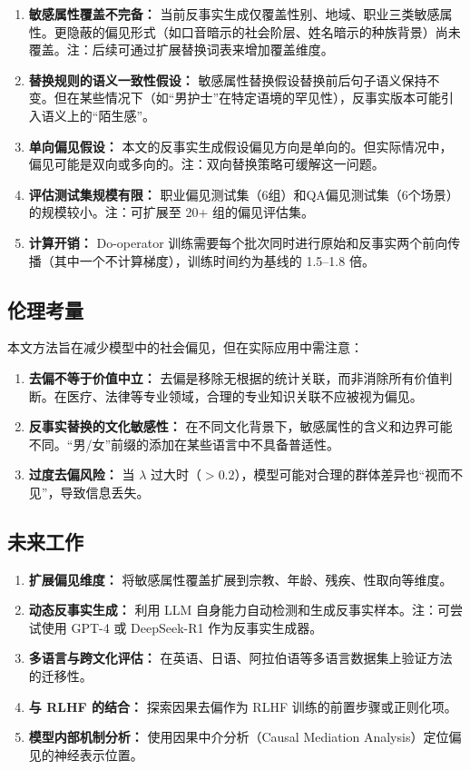 \documentclass[12pt,a4paper,oneside]{ctexart}
\begin{document}
\begin{enumerate}
  \item \textbf{敏感属性覆盖不完备：} 当前反事实生成仅覆盖性别、地域、职业三类敏感属性。更隐蔽的偏见形式（如口音暗示的社会阶层、姓名暗示的种族背景）尚未覆盖。注：后续可通过扩展替换词表来增加覆盖维度。

  \item \textbf{替换规则的语义一致性假设：} 敏感属性替换假设替换前后句子语义保持不变。但在某些情况下（如``男护士''在特定语境的罕见性），反事实版本可能引入语义上的``陌生感''。

  \item \textbf{单向偏见假设：} 本文的反事实生成假设偏见方向是单向的。但实际情况中，偏见可能是双向或多向的。注：双向替换策略可缓解这一问题。

  \item \textbf{评估测试集规模有限：} 职业偏见测试集（6组）和QA偏见测试集（6个场景）的规模较小。注：可扩展至 20+ 组的偏见评估集。

  \item \textbf{计算开销：} Do-operator 训练需要每个批次同时进行原始和反事实两个前向传播（其中一个不计算梯度），训练时间约为基线的 1.5--1.8 倍。
\end{enumerate}

\subsection{伦理考量}

本文方法旨在减少模型中的社会偏见，但在实际应用中需注意：

\begin{enumerate}
  \item \textbf{去偏不等于价值中立：} 去偏是移除无根据的统计关联，而非消除所有价值判断。在医疗、法律等专业领域，合理的专业知识关联不应被视为偏见。
  \item \textbf{反事实替换的文化敏感性：} 在不同文化背景下，敏感属性的含义和边界可能不同。``男/女''前缀的添加在某些语言中不具备普适性。
  \item \textbf{过度去偏风险：} 当 $\lambda$ 过大时（$>0.2$），模型可能对合理的群体差异也``视而不见''，导致信息丢失。
\end{enumerate}

\subsection{未来工作}

\begin{enumerate}
  \item \textbf{扩展偏见维度：} 将敏感属性覆盖扩展到宗教、年龄、残疾、性取向等维度。
  \item \textbf{动态反事实生成：} 利用 LLM 自身能力自动检测和生成反事实样本。注：可尝试使用 GPT-4 或 DeepSeek-R1 作为反事实生成器。
  \item \textbf{多语言与跨文化评估：} 在英语、日语、阿拉伯语等多语言数据集上验证方法的迁移性。
  \item \textbf{与 RLHF 的结合：} 探索因果去偏作为 RLHF 训练的前置步骤或正则化项。
  \item \textbf{模型内部机制分析：} 使用因果中介分析（Causal Mediation Analysis）定位偏见的神经表示位置。
\end{enumerate}
\end{document}
